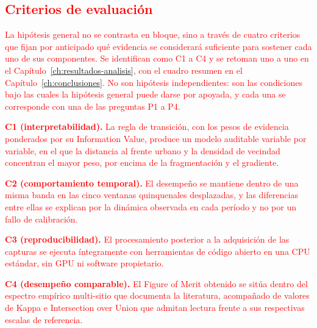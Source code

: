 
\subsection{\textcolor{red}{Criterios de evaluación}}

\textcolor{red}{La hipótesis general no se contrasta en bloque, sino a través de cuatro criterios que fijan por anticipado qué evidencia se considerará suficiente para sostener cada uno de sus componentes. Se identifican como C1 a C4 y se retoman uno a uno en el Capítulo~\ref{ch:resultados-analisis}, con el cuadro resumen en el Capítulo~\ref{ch:conclusiones}. No son hipótesis independientes: son las condiciones bajo las cuales la hipótesis general puede darse por apoyada, y cada una se corresponde con una de las preguntas P1 a P4.}

\textbf{\textcolor{red}{C1 (interpretabilidad).}} \textcolor{red}{La regla de transición, con los pesos de evidencia ponderados por su Information Value, produce un modelo auditable variable por variable, en el que la distancia al frente urbano y la densidad de vecindad concentran el mayor peso, por encima de la fragmentación y el gradiente.}

\textbf{\textcolor{red}{C2 (comportamiento temporal).}} \textcolor{red}{El desempeño se mantiene dentro de una misma banda en las cinco ventanas quinquenales desplazadas, y las diferencias entre ellas se explican por la dinámica observada en cada período y no por un fallo de calibración.}

\textbf{\textcolor{red}{C3 (reproducibilidad).}} \textcolor{red}{El procesamiento posterior a la adquisición de las capturas se ejecuta íntegramente con herramientas de código abierto en una CPU estándar, sin GPU ni software propietario.}

\textbf{\textcolor{red}{C4 (desempeño comparable).}} \textcolor{red}{El Figure of Merit obtenido se sitúa dentro del espectro empírico multi-sitio que documenta la literatura, acompañado de valores de Kappa e Intersection over Union que admitan lectura frente a sus respectivas escalas de referencia.}


